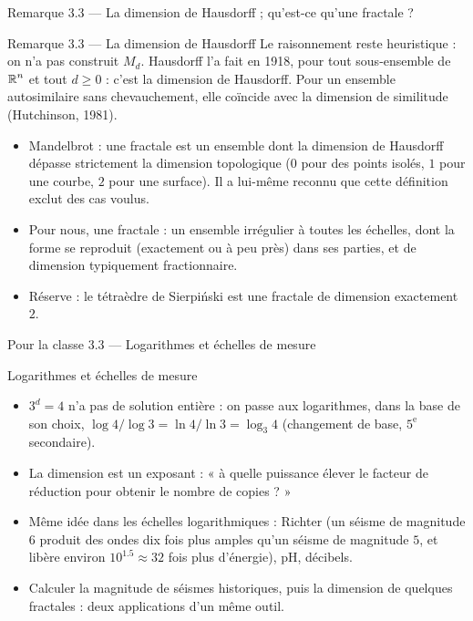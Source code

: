\begin{frame}{Remarque 3.3 --- La dimension de Hausdorff ; qu'est-ce qu'une fractale ?}
  \begin{Rem}{Remarque 3.3 --- La dimension de Hausdorff}
    \footnotesize Le raisonnement reste heuristique : on n'a pas construit
    $M_d$. Hausdorff l'a fait en 1918, pour tout sous-ensemble de $\operatorname{\mathbb{R}}^n$
    et tout $d\geq0$ : c'est la dimension de Hausdorff. Pour un ensemble
    autosimilaire sans chevauchement, elle coïncide avec la dimension de
    similitude (Hutchinson, 1981).
  \end{Rem}
  \small
  \begin{itemize}
    \item Mandelbrot : une fractale est un ensemble dont la dimension de
      Hausdorff dépasse strictement la dimension topologique ($0$ pour
      des points isolés, $1$ pour une courbe, $2$ pour une surface). Il
      a lui-même reconnu que cette définition exclut des cas voulus.
    \item Pour nous, une fractale : un ensemble irrégulier à toutes
      les échelles, dont la forme se reproduit (exactement ou à peu près)
      dans ses parties, et de dimension typiquement fractionnaire.
    \item Réserve : le tétraèdre de Sierpiński est une fractale de
      dimension exactement $2$.
  \end{itemize}
\end{frame}

\begin{frame}{Pour la classe 3.3 --- Logarithmes et échelles de mesure}
  \begin{Classe}{Logarithmes et échelles de mesure}
    \small
    \begin{itemize}
      \item $3^d=4$ n'a pas de solution entière : on passe aux
        logarithmes, dans la base de son choix,
        $\log4/\log3 = \ln4/\ln3 = \log_3 4$ (changement de base,
        $5^{\text{e}}$ secondaire).
      \item La dimension est un exposant : « à quelle puissance élever
        le facteur de réduction pour obtenir le nombre de copies ? »
      \item Même idée dans les échelles logarithmiques : Richter (un
        séisme de magnitude $6$ produit des ondes dix fois plus amples
        qu'un séisme de magnitude $5$, et libère environ
        $10^{\num{1.5}}\approx32$ fois plus d'énergie), pH, décibels.
      \item Calculer la magnitude de séismes historiques, puis la
        dimension de quelques fractales : deux applications d'un même
        outil.
    \end{itemize}
  \end{Classe}
\end{frame}
